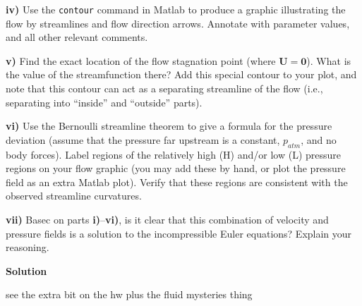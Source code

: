 \documentclass{article}
\def\*#1{\mathbf{#1}}
\begin{document}
\textbf{iv)} Use the \texttt{contour} command in Matlab to produce a
graphic illustrating the flow by streamlines and flow direction arrows.
Annotate with parameter values, and all other relevant comments.

\textbf{v)} Find the exact location of the flow stagnation point (where
$\*U = \*0$). What is the value of the streamfunction there? Add this
special contour to your plot, and note that this contour can act as a
separating streamline of the flow (i.e., separating into ``inside'' and
``outside'' parts).

\textbf{vi)} Use the Bernoulli streamline theorem to give a formula for
the pressure deviation (assume that the pressure far upstream is a
constant, $p_{atm}$, and no body forces). Label regions of the
relatively high (H) and/or low (L) pressure regions on your flow graphic
(you may add these by hand, or plot the pressure field as an extra
Matlab plot). Verify that these regions are consistent with the observed
streamline curvatures.

\textbf{vii)} Basec on parts \textbf{i)}--\textbf{vi)}, is it clear that
this combination of velocity and pressure fields is a solution to the
incompressible Euler equations? Explain your reasoning.

\newpage

\textbf{Solution}

see the extra bit on the hw plus the fluid mysteries thing
\end{document}
